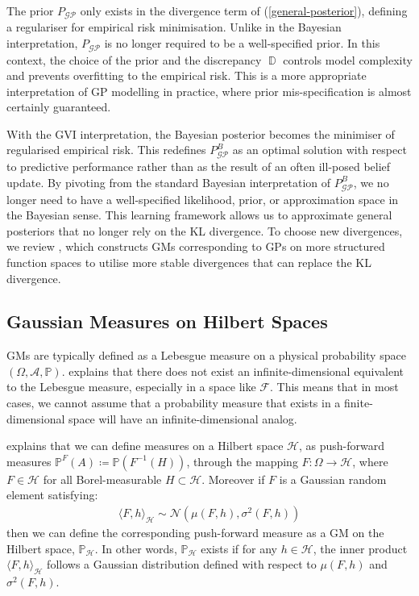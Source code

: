 \documentclass{article}
\newcommand{\D}{\operatorname{\mathbb{D}}}
\newcommand{\GP}{\operatorname{\mathcal{GP}}}
\numberwithin{equation}{section}
\begin{document}
The prior $P_{\GP}$ only exists in the divergence term of (\ref{general-posterior}), defining a regulariser for empirical risk minimisation. Unlike in the Bayesian interpretation, $P_{\GP}$ is no longer required to be a well-specified prior. In this context, the choice of the prior and the discrepancy $\D$ controls model complexity and prevents overfitting to the empirical risk. This is a more appropriate interpretation of GP modelling in practice, where prior mis-specification is almost certainly guaranteed.

With the GVI interpretation, the Bayesian posterior becomes the minimiser of regularised empirical risk. This redefines $P_{\GP}^B$ as an optimal solution with respect to predictive performance rather than as the result of an often ill-posed belief update. By pivoting from the standard Bayesian interpretation of $P_{\GP}^B$, we no longer need to have a well-specified likelihood, prior, or approximation space in the Bayesian sense. This learning framework allows us to approximate general posteriors that no longer rely on the KL divergence. To choose new divergences, we review \cite{wild2022generalized}, which constructs GMs corresponding to GPs on more structured function spaces to utilise more stable divergences that can replace the KL divergence.

\subsection{Gaussian Measures on Hilbert Spaces}
GMs are typically defined as a Lebesgue measure on a physical probability space $(\Omega, \mathcal{A}, \mathbb{P})$. \cite{matthews2017scalable} explains that there does not exist an infinite-dimensional equivalent to the Lebesgue measure, especially in a space like $\mathcal{F}$. This means that in most cases, we cannot assume that a  probability measure that exists in a finite-dimensional space will have an infinite-dimensional analog.

\cite{wild2022generalized} explains that we can define measures on a Hilbert space $\mathcal{H}$, as push-forward measures $\mathbb{P}^{F}(A) \coloneqq \mathbb{P}(F^{-1}(H))$, through the mapping $F: \Omega \rightarrow \mathcal{H}$, where $F \in \mathcal{H}$ for all Borel-measurable $H \subset \mathcal{H}$. Moreover if $F$ is a Gaussian random element satisfying:
\begin{align}
    \langle F, h \rangle_\mathcal{H} \sim \mathcal{N}\left(\mu(F, h), \sigma^2(F, h)\right)
\label{gre}
\end{align}
then we can define the corresponding push-forward measure as a GM on the Hilbert space, $\mathbb{P}_{\mathcal{H}}$. In other words, $\mathbb{P}_{\mathcal{H}}$ exists if for any $h \in \mathcal{H}$, the inner product $\langle F, h \rangle_\mathcal{H}$ follows a Gaussian distribution defined with respect to $\mu(F, h)$ and $\sigma^2(F, h)$.
\end{document}

